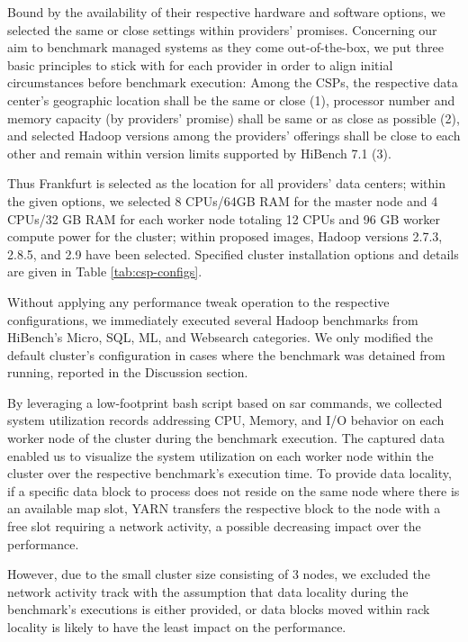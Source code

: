 \documentclass[review]{elsarticle}
\begin{document}
Bound by the availability of their respective hardware and software options, we selected the same or close settings within providers' promises. Concerning our aim to benchmark managed systems as they come out-of-the-box, we put three basic principles to stick with for each provider in order to align initial circumstances before benchmark execution: Among the CSPs, the respective data center's geographic location shall be the same or close (1), processor number and memory capacity (by providers' promise) shall be same or as close as possible (2), and selected Hadoop versions among the providers' offerings shall be close to each other and remain within version limits supported by HiBench 7.1 (3). 

Thus Frankfurt is selected as the location for all providers' data centers; within the given options, we selected 8 CPUs/64GB RAM for the master node and 4 CPUs/32 GB RAM for each worker node totaling 12 CPUs and 96 GB worker compute power for the cluster; within proposed images, Hadoop versions 2.7.3, 2.8.5, and 2.9 have been selected. Specified cluster installation options and details are given in Table \ref{tab:csp-configs}.

Without applying any performance tweak operation to the respective configurations, we immediately executed several Hadoop benchmarks from HiBench's Micro, SQL, ML, and Websearch categories. We only modified the default cluster's configuration in cases where the benchmark was detained from running, reported in the Discussion section.

By leveraging a low-footprint bash script based on sar commands, we collected system utilization records addressing CPU, Memory, and I/O behavior on each worker node of the cluster during the benchmark execution. The captured data enabled us to visualize the system utilization on each worker node within the cluster over the respective benchmark's execution time. To provide data locality, if a specific data block to process does not reside on the same node where there is an available map slot, YARN transfers the respective block to the node with a free slot requiring a network activity, a possible decreasing impact over the performance. 

However, due to the small cluster size consisting of 3 nodes, we excluded the network activity track with the assumption that data locality during the benchmark's executions is either provided, or data blocks moved within rack locality is likely to have the least impact on the performance.
\end{document}
